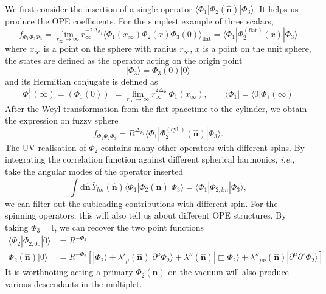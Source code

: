 \documentclass{timesjhep}
\begin{document}
We first consider the insertion of a single operator $\langle\Phi_1|\Phi_2(\hat{\mathbf{n}})|\Phi_3\rangle$. It helps us produce the OPE coefficients. For the simplest example of three scalars, \begin{equation}     f_{\Phi_1\Phi_2\Phi_3}=\lim_{r_\infty\to\infty}r_\infty^{-2\Delta_{\Phi_1}}\langle \Phi_1(x_\infty)\Phi_2(x)\Phi_3(0)\rangle_\mathrm{flat}=\langle\Phi_1|\Phi_2^{(\mathrm{flat})}(x)|\Phi_3\rangle \end{equation} where $x_\infty$ is a point on the sphere with radius $r_\infty$, $x$ is a point on the unit sphere, the states are defined as the operator acting on the origin point 
\begin{equation} 
    |\Phi_3\rangle=\Phi_3(0)|0\rangle 
\end{equation} 
and its Hermitian conjugate is defined as 
\begin{equation}
    \Phi_1^\dagger(\infty)=(\Phi_1(0))^\dagger=\lim_{r_\infty\to\infty}r_\infty^{2\Delta_{\Phi_1}}\Phi_1(x_\infty),\qquad     \langle\Phi_1|=\langle0|\Phi_1^\dagger(\infty) 
\end{equation} 
After the Weyl transformation from the flat spacetime to the cylinder, we obtain the expression on fuzzy sphere 
\begin{equation}
    f_{\Phi_1\Phi_2\Phi_3}=R^{\Delta_{\Phi_2}}\langle\Phi_1|\Phi^{(\mathrm{cyl.})}_2(\hat{\mathbf{n}})|\Phi_3\rangle.
\end{equation} 
The UV realisation of $\Phi_2$ contains many other operators with different spins. By integrating the correlation function against different spherical harmonics, \textit{i.e.}, take the angular modes of the operator inserted 
\begin{equation}
    \int\mathrm{d}\hat{\mathbf{n}}\,\bar{Y}_{lm}(\hat{\mathbf{n}})\langle\Phi_1|\Phi_2(\hat{\mathbf{n}})|\Phi_3\rangle=\langle\Phi_1|\Phi_{2,lm}|\Phi_3\rangle,
\end{equation} 
we can filter out the subleading contributions with different spin. For the spinning operators, this will also tell us about different OPE structures. By taking $\Phi_3=\mathbb{I}$, we can recover the two point functions 
\begin{align}
    \langle\Phi_2|\Phi_{2,00}|0\rangle&=R^{-\Phi_2}\nonumber\\
    \Phi_2(\hat{\mathbf{n}})|0\rangle&=R^{-\Phi_2}\left[|\Phi_2\rangle+\lambda'_\mu(\hat{\mathbf{n}})|\partial^\mu\Phi_2\rangle+\lambda''(\hat{\mathbf{n}})|\Box\Phi_2\rangle+\lambda''_{\mu\nu}(\hat{\mathbf{n}})|\partial^\mu\partial^\nu\Phi_2\rangle\right]
\end{align} 
It is worthnoting acting a primary $\Phi_2(\hat{\mathbf{n}})$ on the vacuum will also produce various descendants in the multiplet. 
\end{document}
